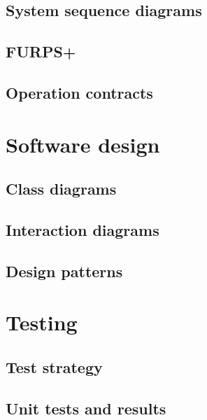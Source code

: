 \documentclass[a4paper,11pt]{article}
\begin{document}
\subsection{System sequence diagrams}


\subsection{FURPS+}


\subsection{Operation contracts}


\pagebreak
\section{Software design}


\subsection{Class diagrams}


\subsection{Interaction diagrams}


\subsection{Design patterns}



\pagebreak

\pagebreak

\pagebreak
\section{Testing}


\subsection{Test strategy}


\subsection{Unit tests and results}


\pagebreak


\pagebreak


\pagebreak


\pagebreak
\appendix

\end{document}
